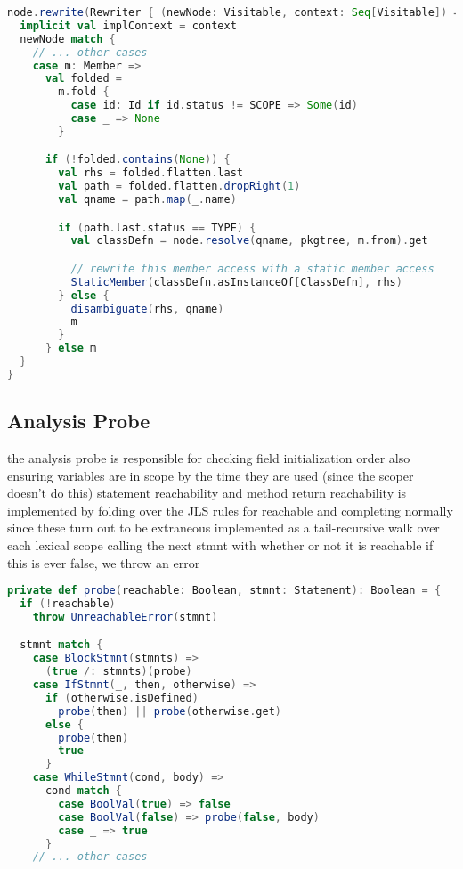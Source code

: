 \documentclass{article}
\begin{document}
\begin{lstlisting}[language=Scala]
node.rewrite(Rewriter { (newNode: Visitable, context: Seq[Visitable]) =>
  implicit val implContext = context
  newNode match {
    // ... other cases
    case m: Member =>
      val folded =
        m.fold {
          case id: Id if id.status != SCOPE => Some(id)
          case _ => None
        }

      if (!folded.contains(None)) {
        val rhs = folded.flatten.last
        val path = folded.flatten.dropRight(1)
        val qname = path.map(_.name)

        if (path.last.status == TYPE) {
          val classDefn = node.resolve(qname, pkgtree, m.from).get

          // rewrite this member access with a static member access
          StaticMember(classDefn.asInstanceOf[ClassDefn], rhs)
        } else {
          disambiguate(rhs, qname)
          m
        }
      } else m
  }
}
\end{lstlisting}



\subsection{Analysis Probe}
the analysis probe is responsible for checking field initialization order
also ensuring variables are in scope by the time they are used
    (since the scoper doesn't do this)
statement reachability
and method return
reachability is implemented by folding over the JLS rules for reachable and completing normally
since these turn out to be extraneous
    implemented as a tail-recursive walk over each lexical scope
    calling the next stmnt with whether or not it is reachable
        if this is ever false, we throw an error

\begin{lstlisting}[language=Scala]
private def probe(reachable: Boolean, stmnt: Statement): Boolean = {
  if (!reachable)
    throw UnreachableError(stmnt)

  stmnt match {
    case BlockStmnt(stmnts) =>
      (true /: stmnts)(probe)
    case IfStmnt(_, then, otherwise) =>
      if (otherwise.isDefined)
        probe(then) || probe(otherwise.get)
      else {
        probe(then)
        true
      }
    case WhileStmnt(cond, body) =>
      cond match {
        case BoolVal(true) => false
        case BoolVal(false) => probe(false, body)
        case _ => true
      }
    // ... other cases
\end{lstlisting}
\end{document}
